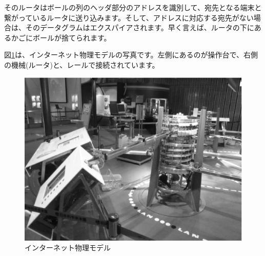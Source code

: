 そのルータはボールの列のヘッダ部分のアドレスを識別して、宛先となる端末と繋がっているルータに送り込みます。そして、アドレスに対応する宛先がない場合は、そのデータグラムはエクスパイアされます。早く言えば、ルータの下にあるかごにボールが捨てられます。

図\ref{fig:miraikan}は、インターネット物理モデルの写真です。左側にあるのが操作台で、右側の機械(ルータ)と、レールで接続されています。


\begin{figure}[htbp]
	\includegraphics[width=12cm,clip]{draw/miraikan.eps}
	\caption{インターネット物理モデル}
	\label{fig:miraikan}
\end{figure}

